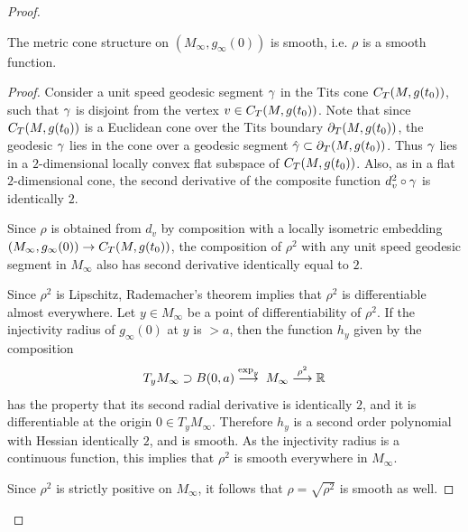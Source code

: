 \begin{proof}
\begin{lemma}
  \label{lem:kl-asymptotic-scalar-curvature-asymptotic-volume-ratio-scalar-curvature-lemma}

The metric cone structure on $(M_\infty,g_\infty(0))$  is
smooth, i.e. $\rho$ is a smooth function.
\end{lemma}
\begin{proof}
Consider a unit speed geodesic segment $\gamma$ in the Tits cone
$C_T(M,g(t_0))$,
such that $\gamma$ is disjoint from the vertex $v\in C_T(M,g(t_0))$.
Note that since $C_T(M,g(t_0))$ is a Euclidean cone over
the Tits boundary $\partial_T (M,g(t_0))$, the
geodesic $\gamma$ lies in the cone over a geodesic segment
$\hat{\gamma}\subset\partial_T (M,g(t_0))$.
Thus $\gamma$ lies in a
$2$-dimensional
locally convex flat subspace of $C_T(M,g(t_0))$.
Also, as in a flat $2$-dimensional cone,
the second derivative of the composite function
$d_v^2\circ\gamma$ is identically $2$.

Since $\rho$ is obtained from $d_v$ by composition with a locally isometric
embedding $(M_\infty,g_\infty(0))\rightarrow C_T(M,g(t_0))$, the composition
of $\rho^2$ with any unit speed geodesic segment in $M_\infty$
also has second derivative identically equal to $2$.


Since $\rho^2$ is Lipschitz, Rademacher's theorem implies that $\rho^2$
is differentiable almost everywhere.
Let $y\in M_\infty$ be a point of differentiability of $\rho^2$.
 If the injectivity radius of $g_\infty(0)$ at
$y$ is $>a$, then the function $h_y$ given by  the composition
$$
T_yM_\infty\supset B(0,a)\stackrel{\exp_y}{\longrightarrow}\;M_\infty
\stackrel{\rho^2}{\longrightarrow}{\mathbb R}
$$
has the property that its second radial derivative is identically $2$,
and it is differentiable at the origin $0\in T_yM_\infty$.
Therefore
$h_y$ is a second order polynomial with Hessian identically $2$,
and is smooth.  As the injectivity radius is a continuous function, this
implies that $\rho^2$ is smooth everywhere in $M_\infty$.

Since $\rho^2$ is strictly positive on $M_\infty$,
it follows that $\rho=\sqrt{\rho^2}$
is smooth as well.
\end{proof}


\end{proof}
